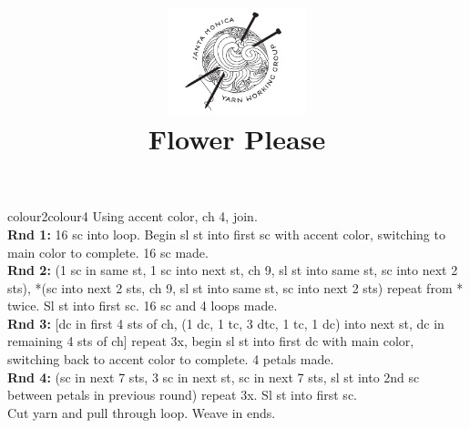 \documentclass{../knittingpattern}
\begin{document}
\title{\includegraphics[width=4cm]{../SMYWG_FINAL.pdf}\\Flower Please}
\author{}
\date{}
\maketitle









\begin{pattern}{colour2}{colour4}
Using accent color, ch 4, join.\\
\textbf{Rnd 1:} 16 sc into loop. Begin sl st into first sc with accent color, switching to main color to complete. 16 sc made.\\
\textbf{Rnd 2:} (1 sc in same st, 1 sc into next st, ch 9, sl st into same st, sc into next 2 sts), *(sc into next 2 sts, ch 9, sl st into same st, sc into next 2 sts) repeat from * twice. Sl st into first sc. 16 sc and 4 loops made.\\
\textbf{Rnd 3:} [dc in first 4 sts of ch, (1 dc, 1 tc, 3 dtc, 1 tc, 1 dc) into next st, dc in remaining 4 sts of ch] repeat 3x, begin sl st into first dc with main color, switching back to accent color to complete. 4 petals made.\\
\textbf{Rnd 4:} (sc in next 7 sts, 3 sc in next st, sc in next 7 sts, sl st into 2nd sc between petals in previous round) repeat 3x. Sl st into first sc.\\
Cut yarn and pull through loop. Weave in ends.\\
\end{pattern}
\end{document}
